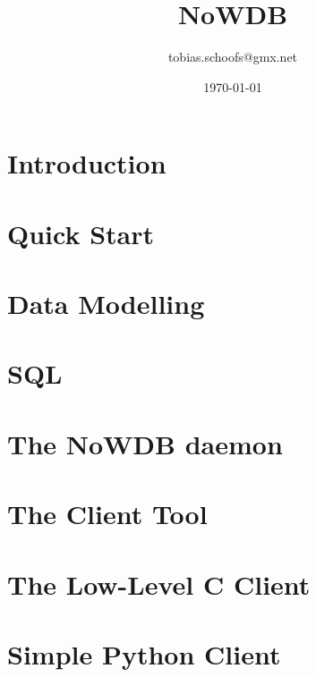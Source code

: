 \documentclass{scrreprt}
\begin{document}
\setlength{\parindent}{0pt}
\setlength{\parskip}{8pt}

\title {NoWDB}
\author {tobias.schoofs@gmx.net}
\date{\today}
\maketitle
\tableofcontents

\chapter{Introduction}\label{chpt_intro} 


\chapter{Quick Start}\label{chpt_quickst}


\chapter{Data Modelling}\label{chpt_model}

\chapter{SQL}\label{chpt_sql}


\chapter{The NoWDB daemon}\label{chpt_nowdbd}


\chapter{The Client Tool}\label{chpt_clienttool}

\chapter{The Low-Level C Client}\label{chpt_llc}


\chapter{Simple Python Client}\label{chpt_pythonclient}

\end{document}
